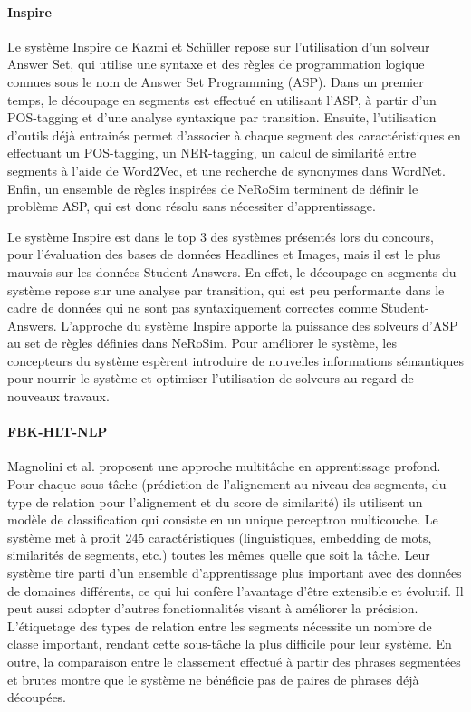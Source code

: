 \documentclass[a4paper, twoside, 11pt]{article}
\begin{document}
        \paragraph{Inspire}
        \hfill \break
Le système Inspire de Kazmi et Schüller \cite{kazmi} repose sur l'utilisation d'un solveur Answer Set, qui utilise une syntaxe et des règles de programmation logique connues sous le nom de Answer Set Programming (ASP). Dans un premier temps, le découpage en segments est effectué en utilisant l'ASP, à partir d'un POS-tagging et d'une analyse syntaxique par transition. Ensuite, l'utilisation d'outils déjà entrainés permet d'associer à chaque segment des caractéristiques en effectuant un POS-tagging, un NER-tagging, un calcul de similarité entre segments à l'aide de Word2Vec, et une recherche de synonymes dans WordNet. Enfin, un ensemble de règles inspirées de NeRoSim terminent de définir le problème ASP, qui est donc résolu sans nécessiter d'apprentissage.

Le système Inspire est dans le top 3 des systèmes présentés lors du concours, pour l'évaluation des bases de données Headlines et Images, mais il est le plus mauvais sur les données Student-Answers. En effet, le découpage en segments du système repose sur une analyse par transition, qui est peu performante dans le cadre de données qui ne sont pas syntaxiquement correctes comme Student-Answers. L'approche du système Inspire apporte la puissance des solveurs d'ASP au set de règles définies dans NeRoSim. Pour améliorer le système, les concepteurs du système espèrent introduire de nouvelles informations sémantiques pour nourrir le système et optimiser l'utilisation de solveurs au regard de nouveaux travaux.

        \paragraph{FBK-HLT-NLP}
        \hfill \break
Magnolini et al. \cite{magnolini} proposent une approche multitâche en apprentissage profond. Pour chaque sous-tâche (prédiction de l’alignement au niveau des segments, du type de relation pour l’alignement et du score de similarité) ils utilisent un modèle de classification qui consiste en un unique perceptron multicouche. Le système met à profit 245 caractéristiques (linguistiques, embedding de mots, similarités de segments, etc.) toutes les mêmes quelle que soit la tâche.
Leur système tire parti d'un ensemble d'apprentissage plus important avec des données de domaines différents, ce qui lui confère l’avantage d’être extensible et évolutif. Il peut aussi adopter d’autres fonctionnalités visant à améliorer la précision.
L'étiquetage des types de relation entre les segments nécessite un nombre de classe important, rendant cette sous-tâche la plus difficile pour leur système.
En outre, la comparaison entre le classement effectué à partir des phrases segmentées et brutes montre que le système ne bénéficie pas de paires de phrases déjà découpées.
\end{document}
